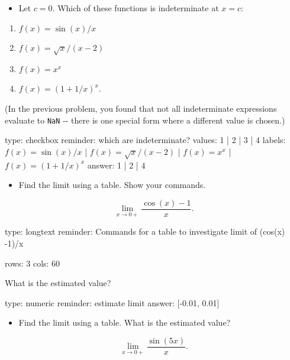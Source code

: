 \documentclass[12pt]{article}
\begin{document}
\begin{itemize}
\itemsep1pt\parskip0pt
\item
  Let $c=0$. Which of these functions is indeterminate at $x=c$:
\end{itemize}

\begin{enumerate}
\def\labelenumi{\arabic{enumi})}
\item
  $f(x) = \sin(x)/x$
\item
  $f(x) = \sqrt{x}/(x-2)$
\item
  $f(x) = x^x$
\item
  $f(x) = (1 + 1/x)^x$.
\end{enumerate}

(In the previous problem, you found that not all indeterminate
expressions evaluate to \texttt{NaN} -{}- there is one special form
where a different value is chosen.)

\begin{answer}
type: checkbox
reminder: which are indeterminate?
values: 1 | 2 | 3 | 4
labels: \( f(x) = \sin(x)/x \) | \( f(x) = \sqrt{x}/(x-2) \) | \( f(x) = x^x \) | \( f(x) = (1 + 1/x)^x \)
answer: 1 | 2 | 4
\end{answer}

\begin{itemize}
\itemsep1pt\parskip0pt
\item
  Find the limit using a table. Show your commands.
\end{itemize}

\[
\lim_{x \rightarrow 0+} \frac{\cos(x) - 1}{x}.
\]

\begin{answer}
type: longtext
reminder: Commands for a table to investigate limit of (cos(x) -1)/x

rows: 3
cols: 60
\end{answer}

What is the estimated value?

\begin{answer}
    type: numeric
    reminder: estimate limit
    answer: [-0.01, 0.01]

\end{answer}

\begin{itemize}
\itemsep1pt\parskip0pt
\item
  Find the limit using a table. What is the estimated value?
\end{itemize}

\[
\lim_{x \rightarrow 0+} \frac{\sin(5x)}{x}.
\]
\end{document}

